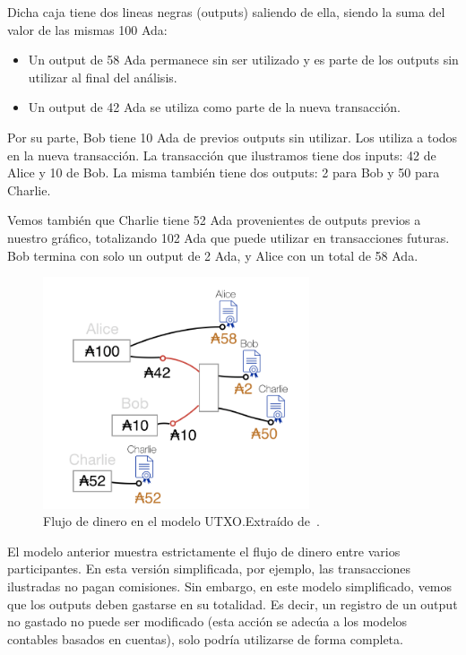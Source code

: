 \documentclass[12pt]{book}
\begin{document}
Dicha caja tiene dos lineas negras (outputs) saliendo de ella, siendo la suma del valor de las mismas 100 Ada:

\begin{itemize}
	\item Un output de 58 Ada permanece sin ser utilizado y es parte de los outputs sin utilizar al final del análisis.
	\item Un output de 42 Ada se utiliza como parte de la nueva transacción.
\end{itemize}

Por su parte, Bob tiene 10 Ada de previos outputs sin utilizar. Los utiliza a todos en la nueva transacción. La transacción que ilustramos tiene dos inputs: 42 de Alice y 10 de Bob. La misma también tiene dos outputs: 2 para Bob y 50 para Charlie.

Vemos también que Charlie tiene 52 Ada provenientes de outputs previos a nuestro gráfico, totalizando 102 Ada que puede utilizar en transacciones futuras. Bob termina con solo un output de 2 Ada, y Alice con un total de 58 Ada.

\begin{figure}
	\centering
	\includegraphics[width=0.7\textwidth]{UTXO_Funds_Flow_Example.png}
    \caption[Flujo de dinero en el modelo UTXO.]{Flujo de dinero en el modelo UTXO.\@ Extraído de~\cite{plutus-smart-contracts}.}\label{fig:UTXO_Funds_Flow_Example}
\end{figure}

El modelo anterior muestra estrictamente el flujo de dinero entre varios participantes. En esta versión simplificada, por ejemplo, las transacciones ilustradas no pagan comisiones. Sin embargo, en este modelo simplificado, vemos que los outputs deben gastarse en su totalidad. Es decir, un registro de un output no gastado no puede ser modificado (esta acción se adecúa a los modelos contables basados en cuentas), solo podría utilizarse de forma completa.
\end{document}
